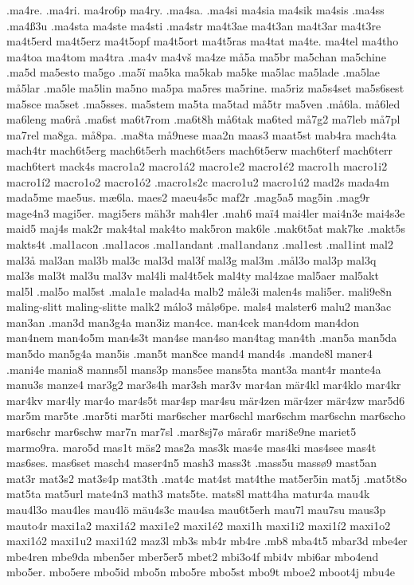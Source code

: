 {{.ma4re.
.ma4ri.
ma4ro6p
ma4ry.
.ma4sa.
.ma4si
ma4sia
ma4sik
ma4sis
.ma4ss
.ma4ß3u
.ma4sta
ma4ste
ma4sti
.ma4str
ma4t3ae
ma4t3an
ma4t3ar
ma4t3re
ma4t5erd
ma4t5erz
ma4t5opf
ma4t5ort
ma4t5ras
ma4tat
ma4te.
ma4tel
ma4tho
ma4toa
ma4tom
ma4tra
.ma4v
ma4vš
ma4ze
må5a
ma5br
ma5chan
ma5chine
.ma5d
ma5esto
ma5go
.ma5ï
ma5ka
ma5kab
ma5ke
ma5lac
ma5lade
.ma5lae
må5lar
.ma5le
ma5lin
ma5no
ma5pa
ma5res
ma5rine.
ma5riz
ma5s4set
ma5s6sest
ma5sce
ma5set
.ma5sses.
ma5stem
ma5ta
ma5tad
må5tr
ma5ven
.må6la.
må6led
ma6leng
ma6rå
.ma6st
ma6t7rom
.ma6t8h
må6tak
ma6ted
må7g2
ma7leb
må7pl
ma7rel
ma8ga.
må8pa.
.ma8ta
må9nese
maa2n
maas3
maat5st
mab4ra
mach4ta
mach4tr
mach6t5erg
mach6t5erh
mach6t5ers
mach6t5erw
mach6terf
mach6terr
mach6tert
mack4s
macro1a2
macro1á2
macro1e2
macro1é2
macro1h
macro1i2
macro1í2
macro1o2
macro1ó2
.macro1s2c
macro1u2
macro1ú2
mad2s
mada4m
mada5me
mae5us.
mæ6la.
maes2
maeu4s5c
maf2r
.mag5a5
mag5in
.mag9r
mage4n3
magi5er.
magi5ers
mäh3r
mah4ler
.mah6
maï4
mai4ler
mai4n3e
mai4s3e
maid5
maj4s
mak2r
mak4tal
mak4to
mak5ron
mak6le
.mak6t5at
mak7ke
.makt5s
makts4t
.mal1acon
.mal1acos
.mal1andant
.mal1andanz
.mal1est
.mal1int
mal2
mal3å
mal3an
mal3b
mal3c
mal3d
mal3f
mal3g
mal3m
.mål3o
mal3p
mal3q
mal3s
mal3t
mal3u
mal3v
mal4li
mal4t5ek
mal4ty
mal4zae
mal5aer
mal5akt
mal5l
.mal5o
mal5st
.mala1e
malad4a
malb2
måle3i
malen4s
mali5er.
mali9e8n
maling-slitt
maling-slitte
malk2
málo3
målø6pe.
mals4
malster6
malu2
man3ac
man3an
.man3d
man3g4a
man3iz
man4ce.
man4cek
man4dom
man4don
man4nem
man4o5m
man4s3t
man4se
man4so
man4tag
man4th
.man5a
man5da
man5do
man5g4a
man5is
.man5t
man8ce
mand4
mand4s
.mande8l
maner4
.mani4e
mania8
manns5l
mans3p
mans5ee
mans5ta
mant3a
mant4r
mante4a
manu3s
manze4
mar3g2
mar3s4h
mar3sh
mar3v
mar4an
mär4kl
mar4klo
mar4kr
mar4kv
mar4ly
mar4o
mar4s5t
mar4sp
mar4su
mär4zen
mär4zer
mär4zw
mar5d6
mar5m
mar5te
.mar5ti
mar5ti
mar6scher
mar6schl
mar6schm
mar6schn
mar6scho
mar6schr
mar6schw
mar7n
mar7sl
.mar8sj7ø
måra6r
mari8e9ne
mariet5
marmo9ra.
maro5d
mas1t
mäs2
mas2a
mas3k
mas4e
mas4ki
mas4see
mas4t
mas6ses.
mas6set
masch4
maser4n5
mash3
mass3t
.mass5u
massø9
mast5an
mat3r
mat3s2
mat3s4p
mat3th
.mat4c
mat4st
mat4the
mat5er5in
mat5j
.mat5t8o
mat5ta
mat5url
mate4n3
math3
mats5te.
mats8l
matt4ha
matur4a
mau4k
mau4l3o
mau4les
mau4lö
mäu4s3c
mau4sa
mau6t5erh
mau7l
mau7su
maus3p
mauto4r
maxi1a2
maxi1á2
maxi1e2
maxi1é2
maxi1h
maxi1i2
maxi1í2
maxi1o2
maxi1ó2
maxi1u2
maxi1ú2
maz3l
mb3s
mb4r
mb4re
.mb8
mba4t5
mbar3d
mbe4er
mbe4ren
mbe9da
mben5er
mber5er5
mbet2
mbi3o4f
mbi4v
mbi6ar
mbo4end
mbo5er.
mbo5ere
mbo5id
mbo5n
mbo5re
mbo5st
mbo9t
mboe2
mboot4j
mbu4e
}}
